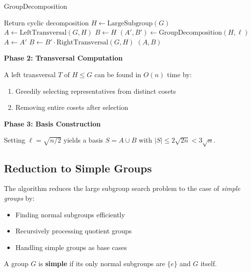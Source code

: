 \documentclass[sigconf]{acmart}
\begin{document}
\begin{algorithm}[H]
\caption{GroupDecomposition}
\begin{algorithmic}[1]
    \STATE Return cyclic decomposition
\ELSE
    \STATE $H \gets \text{LargeSubgroup}(G)$
        \STATE $A \gets \text{LeftTransversal}(G,H)$
        \STATE $B \gets H$
    \ELSE
        \STATE $(A',B') \gets \text{GroupDecomposition}(H,\ell)$
        \STATE $A \gets A'$
        \STATE $B \gets B' \cdot \text{RightTransversal}(G,H)$
    \ENDIF
\ENDIF
\RETURN $(A,B)$
\end{algorithmic}
\end{algorithm}

\textbf{Phase 2: Transversal Computation}
\begin{lemma}
A left transversal $T$ of $H \leq G$ can be found in $O(n)$ time by:
\begin{enumerate}
    \item Greedily selecting representatives from distinct cosets
    \item Removing entire cosets after selection
\end{enumerate}
\end{lemma}

\textbf{Phase 3: Basis Construction}
\begin{corollary}
Setting $\ell = \sqrt{n/2}$ yields a basis $S = A \cup B$ with $|S| \leq 2\sqrt{2n} < 3\sqrt{n}$.
\end{corollary}


\subsection{Reduction to Simple Groups}
\label{sec:simple-groups}

The algorithm reduces the large subgroup search problem to the case of \emph{simple groups} by:
\begin{itemize}
    \item Finding normal subgroups efficiently
    \item Recursively processing quotient groups
    \item Handling simple groups as base cases
\end{itemize}

\begin{definition}
A group \( G \) is \textbf{simple} if its only normal subgroups are \( \{e\} \) and \( G \) itself.
\end{definition}
\end{document}
